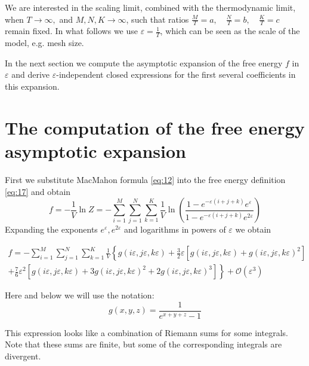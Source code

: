\documentclass{article}
\begin{document}
We are interested in the scaling limit, combined with the thermodynamic limit, when $ T\to \infty,$
and $M,N,K\to \infty$, such that ratios $\frac{M}{T}=a,\quad \frac{N}{T}=b, \quad \frac{K}{T}=c$
remain fixed. In what follows we use $\varepsilon=\frac{1}{T}$, which can be seen as the scale of
the model, e.g. mesh size.

In the next section we compute the asymptotic expansion of the free energy $f$ in $\varepsilon$ and
derive $\varepsilon$-independent closed expressions for the first several coefficients in this
expansion.
  
\section{The computation of the free energy asymptotic expansion}
\label{sec:free-energy-scaling}
First we substitute MacMahon formula \eqref{eq:12} into the free energy definition \eqref{eq:17} and
obtain
\begin{equation}
  \label{eq:20}
    f=-\frac{1}{V}\ln Z =- \sum_{i=1}^{M} \sum_{j=1}^{N} \sum_{k=1}^{K} \frac{1}{V}
  \ln\left(\frac{1-e^{-\varepsilon (i+j+k)} e^{\varepsilon}}{1-e^{-\varepsilon (i+j+k)} e^{2\varepsilon}}\right)
\end{equation}
Expanding the exponents $e^{\varepsilon}, e^{2\varepsilon}$ and logarithms in powers of $\varepsilon$ we obtain


\begin{multline}
  \label{eq:4}
  f=- \sum_{i=1}^{M} \sum_{j=1}^{N} \sum_{k=1}^{K} \frac{1}{V}\left\{
    g(i\varepsilon,j\varepsilon,k\varepsilon)+
    \frac{3}{2}\varepsilon\left[g(i\varepsilon,j\varepsilon,k\varepsilon)+g(i\varepsilon,j\varepsilon,k\varepsilon)^{2}\right]\right.\\
  \left.+\frac{7}{6}\varepsilon^{2}\left[g(i\varepsilon,j\varepsilon,k\varepsilon)+3 g(i\varepsilon,j\varepsilon,k\varepsilon)^{2}+
      2 g(i\varepsilon,j\varepsilon,k\varepsilon)^{3}\right]\right\}  + \mathcal{O}(\varepsilon^{3})
\end{multline}

Here and below we will use the notation:
\begin{equation}
  \label{eq:5}
  g(x,y,z)=\frac{1}{e^{x+y+z}-1}
\end{equation}

This expression looks like a combination of Riemann sums for some integrals. Note that these sums
are finite, but some of the corresponding integrals are divergent.
\end{document}
